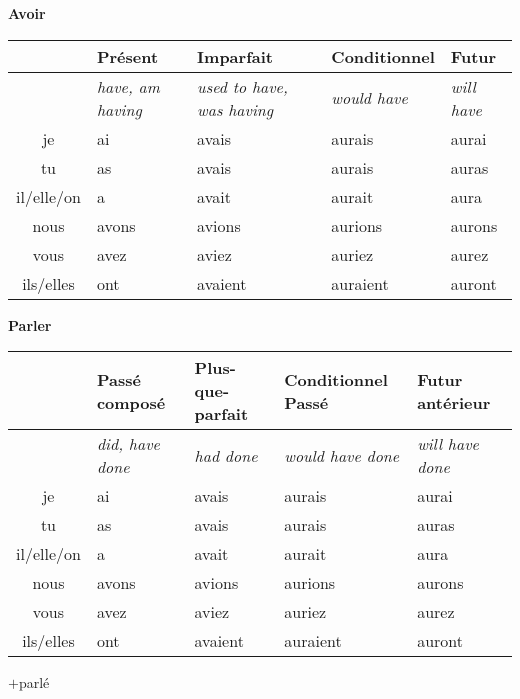 \begin{flushleft}
\textbf{Avoir}
\vskip 0.1cm
\begin{tabular}{|c||L{2.5cm}|L{2.5cm}|L{2.5cm}|L{2.5cm}|}
\hline
& Pr\'esent & Imparfait & Conditionnel & Futur \\
\hline
& \textit{have, am having} & \textit{used to have, was having} & \textit{would have} & \textit{will have} \\
\hline\hline
je            &	ai	&	avais	&	aurais	 &	aurai	\\
tu            &	as 	&	avais	&	aurais	&	auras	\\
il/elle/on  &	a	&	avait	&	aurait	&	aura	\\
nous       &	avons	&	avions	&	aurions	&	aurons	\\
vous       &	avez	&	aviez	&	auriez		&	aurez	\\
ils/elles   &	ont 	&	avaient	&	auraient	&	auront	\\
\hline
\end{tabular}
\end{flushleft}

\begin{flushleft}
\textbf{Parler}
\vskip 0.1cm
\begin{tabular}{|c||L{2.5cm}|L{2.5cm}|L{2.5cm}|L{2.5cm}|}
\hline
& Pass\'e compos\'e & Plus-que-parfait & Conditionnel Pass\'e & Futur ant\'erieur \\
\hline
& \textit{did, have done} & \textit{had done} & \textit{would have done} & \textit{will have done} \\
\hline\hline
je            &	ai	&	avais	&	aurais	 &	aurai	\\
tu            &	as 	&	avais	&	aurais	&	auras	\\
il/elle/on  &	a	&	avait	&	aurait	&	aura	\\
nous       &	avons	&	avions	&	aurions	&	aurons	\\
vous       &	avez	&	aviez	&	auriez		&	aurez	\\
ils/elles   &	ont 	&	avaient	&	auraient	&	auront	\\
\hline
\end{tabular}
\quad$+$\quad parl\'e
\end{flushleft}

